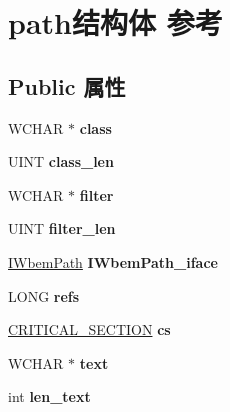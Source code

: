\hypertarget{structpath}{}\section{path结构体 参考}
\label{structpath}
\subsection*{Public 属性}
\begin{DoxyCompactItemize}
\item 
\mbox{\label{structpath_afde8024eb88b56b617ae8a5412168794}} 
W\+C\+H\+AR $\ast$ {\bfseries class}
\item 
\mbox{\label{structpath_a505e3826e69f3f2ed58cf4edaa91c30b}} 
U\+I\+NT {\bfseries class\+\_\+len}
\item 
\mbox{\label{structpath_a228f83a9869103c8f042901ab2f0dbd3}} 
W\+C\+H\+AR $\ast$ {\bfseries filter}
\item 
\mbox{\label{structpath_ab8c64b6ada01211a102e72d4f221dac8}} 
U\+I\+NT {\bfseries filter\+\_\+len}
\item 
\mbox{\label{structpath_a8a16208d7c3c892aa3db6d02a98c9405}} 
\hyperlink{interface_i_wbem_path}{I\+Wbem\+Path} {\bfseries I\+Wbem\+Path\+\_\+iface}
\item 
\mbox{\label{structpath_a54d6b75fa807cf2d5a4e132ab3a1e686}} 
L\+O\+NG {\bfseries refs}
\item 
\mbox{\label{structpath_ab608f38dce9269f92b7c774dff7f9982}} 
\hyperlink{struct___c_r_i_t_i_c_a_l___s_e_c_t_i_o_n}{C\+R\+I\+T\+I\+C\+A\+L\+\_\+\+S\+E\+C\+T\+I\+ON} {\bfseries cs}
\item 
\mbox{\label{structpath_ae8cbe43c60392a33d97bb27be2be7742}} 
W\+C\+H\+AR $\ast$ {\bfseries text}
\item 
\mbox{\label{structpath_a7b5337ccd982a0ed8bb0c6a25267815b}} 
int {\bfseries len\+\_\+text}
\item 
\mbox{\label{structpath_a2ad9da8123b5213bdf2823edf4ebc92e}} 

\end{DoxyCompactItemize}

